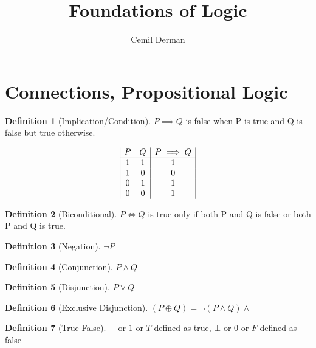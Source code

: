 \documentclass{article}
\title{Foundations of Logic}
\author{Cemil Derman}
\theoremstyle{definition}
\newtheorem{definition}{Definition}[section]
\begin{document}
    \maketitle
    \section{Connections, Propositional Logic}
    \begin{definition}[Implication/Condition]
      $P \implies Q$  is false when P is true and Q is false but true otherwise.

        \begin{displaymath}
       \begin{array}{|c c|c|}
         P & Q & P \implies Q \\
         \hline
        1 & 1 & 1 \\ 
        1 & 0 & 0 \\ %
        0 & 1 & 1 \\ 
        0 & 0 & 1 
         
       \end{array}
     \end{displaymath}


    \end{definition}
    \begin{definition}[Biconditional]
      $P \iff{Q}$ is true only if both P and Q is false or both P and Q is true.
    
    \end{definition}
    
    \begin{definition}[Negation]
      $\neg P$
    \end{definition}

    \begin{definition}[Conjunction]
   $P \wedge Q$
      
    \end{definition}


    \begin{definition}[Disjunction]
      $P \lor Q$
      
    \end{definition}

    \begin{definition}[Exclusive Disjunction]
      $(P \oplus Q) = \neg(P \wedge Q) \wedge $ %

    \end{definition}

    \begin{definition}[True False]
      $\top$ or $1$ or $T$ defined as true, 
      $\bot$ or $0$ or $F$ defined as false
      
    \end{definition}
\end{document}
